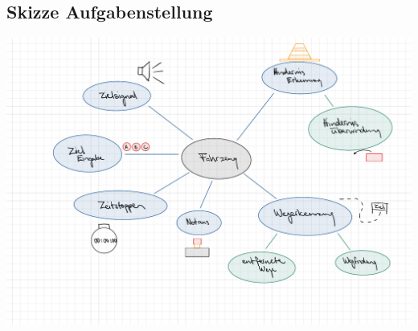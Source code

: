 \newpage
\subsection{Skizze Aufgabenstellung}
\begin{landscape} 
    \includegraphics[scale=0.8]{assets/Skizze_Aufgabenstellung.pdf}
\end{landscape}

